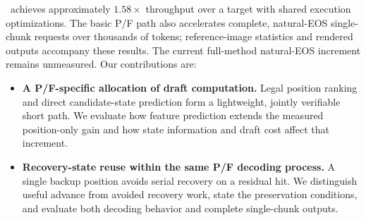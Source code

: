 \PF\ achieves approximately $1.58\times$ throughput over a target with shared execution optimizations. The basic P/F path also accelerates complete, natural-EOS single-chunk requests over thousands of tokens; reference-image statistics and rendered outputs accompany these results. The current full-method natural-EOS increment remains unmeasured. Our contributions are:
\begin{itemize}[leftmargin=*,itemsep=2pt]
\item \textbf{A P/F-specific allocation of draft computation.} Legal position ranking and direct candidate-state prediction form a lightweight, jointly verifiable short path. We evaluate how feature prediction extends the measured position-only gain and how state information and draft cost affect that increment.
\item \textbf{Recovery-state reuse within the same P/F decoding process.} A single backup position avoids serial recovery on a residual hit. We distinguish useful advance from avoided recovery work, state the preservation conditions, and evaluate both decoding behavior and complete single-chunk outputs.
\end{itemize}
